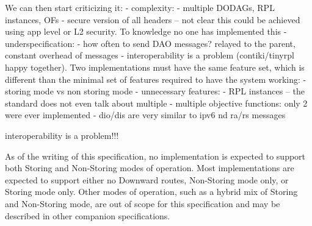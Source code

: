 We can then start criticizing it:
- complexity:
  - multiple DODAGs, RPL instances, OFs
  - secure version of all headers -- not clear this could be achieved using app level
    or L2 security. To knowledge no one has implemented this
- underspecification:
  - how often to send DAO messages? relayed to the parent, constant overhead of messages
  - interoperability is a problem (contiki/tinyrpl happy together). Two implementations
    must have the same feature set, which is different than the minimal set of features
    required to have the system working:
    - storing mode vs non storing mode
- unnecessary features:
  - RPL instances -- the standard does not even talk about multiple
  - multiple objective functions: only 2 were ever implemented
  - dio/dis are very similar to ipv6 nd ra/rs messages
\fi


interoperability is a problem!!!

As of the writing of this specification, no implementation is
expected to support both Storing and Non-Storing modes of operation.
Most implementations are expected to support either no Downward
routes, Non-Storing mode only, or Storing mode only.  Other modes of
operation, such as a hybrid mix of Storing and Non-Storing mode, are
out of scope for this specification and may be described in other
companion specifications.
\fi

